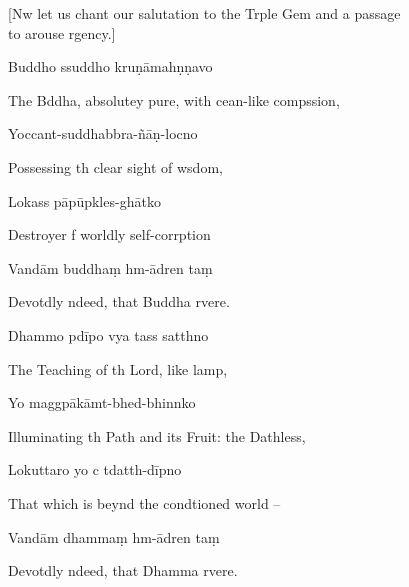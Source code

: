 \begin{english}
  [Nw let us chant our salutation to the Trple Gem and a passage \\to arouse rgency.]
\end{english}

Buddho ssuddho kruṇāmahṇṇavo

\begin{english}
  The Bddha, absolutey pure, with cean-like compssion,
\end{english}

Yoccant-suddhabbra-ñāṇ-locno

\begin{english}
  Possessing th clear sight of wsdom,
\end{english}

Lokass pāpūpkles-ghātko

\begin{english}
  Destroyer f worldly self-corrption
\end{english}

Vandām buddhaṃ hm-ādren taṃ

\begin{english}
  Devotdly ndeed, that Buddha  rvere.
\end{english}

Dhammo pdīpo vya tass satthno

\begin{english}
  The Teaching of th Lord, like  lamp,
\end{english}

Yo maggpākāmt-bhed-bhinnko

\begin{english}
  Illuminating th Path and its Fruit: the Dathless,
\end{english}

Lokuttaro yo c tdatth-dīpno

\begin{english}
  That which is beynd the condtioned world --
\end{english}

Vandām dhammaṃ hm-ādren taṃ

\begin{english}
  Devotdly ndeed, that Dhamma  rvere.
\end{english}

